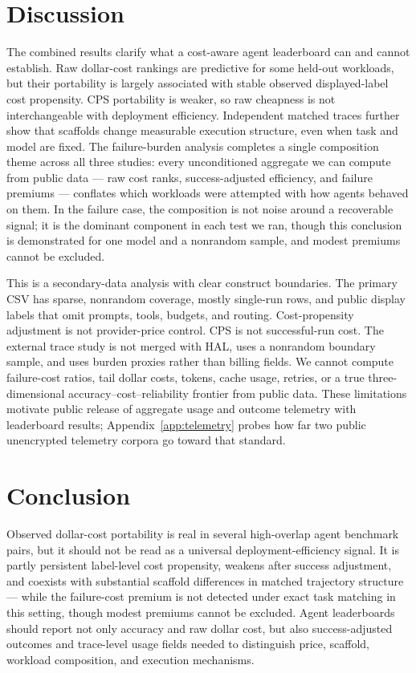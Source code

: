 \documentclass[11pt]{article}
\begin{document}
\section{Discussion}

The combined results clarify what a cost-aware agent leaderboard can and cannot establish. Raw dollar-cost rankings are predictive for some held-out workloads, but their portability is largely associated with stable observed displayed-label cost propensity. CPS portability is weaker, so raw cheapness is not interchangeable with deployment efficiency. Independent matched traces further show that scaffolds change measurable execution structure, even when task and model are fixed. The failure-burden analysis completes a single composition theme across all three studies: every unconditioned aggregate we can compute from public data --- raw cost ranks, success-adjusted efficiency, and failure premiums --- conflates which workloads were attempted with how agents behaved on them. In the failure case, the composition is not noise around a recoverable signal; it is the dominant component in each test we ran, though this conclusion is demonstrated for one model and a nonrandom sample, and modest premiums cannot be excluded.

This is a secondary-data analysis with clear construct boundaries. The primary CSV has sparse, nonrandom coverage, mostly single-run rows, and public display labels that omit prompts, tools, budgets, and routing. Cost-propensity adjustment is not provider-price control. CPS is not successful-run cost. The external trace study is not merged with HAL, uses a nonrandom boundary sample, and uses burden proxies rather than billing fields. We cannot compute failure-cost ratios, tail dollar costs, tokens, cache usage, retries, or a true three-dimensional accuracy--cost--reliability frontier from public data. These limitations motivate public release of aggregate usage and outcome telemetry with leaderboard results; Appendix~\ref{app:telemetry} probes how far two public unencrypted telemetry corpora go toward that standard.

\section{Conclusion}

Observed dollar-cost portability is real in several high-overlap agent benchmark pairs, but it should not be read as a universal deployment-efficiency signal. It is partly persistent label-level cost propensity, weakens after success adjustment, and coexists with substantial scaffold differences in matched trajectory structure --- while the failure-cost premium is not detected under exact task matching in this setting, though modest premiums cannot be excluded. Agent leaderboards should report not only accuracy and raw dollar cost, but also success-adjusted outcomes and trace-level usage fields needed to distinguish price, scaffold, workload composition, and execution mechanisms.
\end{document}
